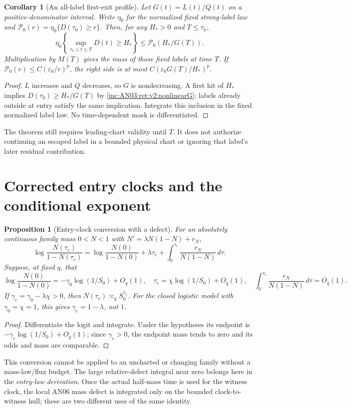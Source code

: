\documentclass[11pt]{article}
\numberwithin{equation}{section}
\newtheorem{proposition}[theorem]{Proposition}
\newtheorem{corollary}[theorem]{Corollary}
\theoremstyle{remark}\newtheorem{remark}[theorem]{Remark}
\newcommand{\dd}{\,d}
\newcommand{\1}{\mathbf 1}
\begin{document}
\begin{corollary}[An all-label first-exit profile]
\label{inc:AN03:ret:v2:exitprofile}
Let $G(t)=L(t)/Q(t)$ on a positive-denominator interval. Write
$\eta_0$ for the normalized fixed strong-label law and
$\mathcal P_0(r)=\eta_0\{D(\tau_0)\ge r\}$.
Then, for any $H_*>0$ and $T\le\tau_h$,
\begin{equation}\label{inc:AN03:ret:v2:exitmass}
 \eta_0\left\{\sup_{\tau_0\le t\le T}D(t)\ge H_*\right\}
 \le\mathcal P_0(H_*/G(T)).
\end{equation}
Multiplication by $M(T)$ gives the mass of those fixed labels at time
$T$. If $\mathcal P_0(r)\le C(\varepsilon_0/r)^p$, the right side is
at most $C(\varepsilon_0G(T)/H_*)^p$.
\end{corollary}
\begin{proof}
$L$ increases and $Q$ decreases, so $G$ is nondecreasing.
A first hit of $H_*$ implies $D(\tau_0)\ge H_*/G(T)$ by
\eqref{inc:AN03:ret:v2:nonlinearG}; labels already outside at entry
satisfy the same implication. Integrate this inclusion in the fixed
normalized label law. No time-dependent mask is differentiated.
\end{proof}
The theorem still requires leading-chart validity until $T$. It does not
authorize continuing an escaped label in a bounded physical chart or
ignoring that label's later residual contribution.

\section{Corrected entry clocks and the conditional exponent}
\label{inc:AN03:ret:v2:clocks}
\begin{proposition}[Entry-clock conversion with a defect]
\label{inc:AN03:ret:v2:clockconversion}
For an absolutely continuous family mass $0<N<1$ with
$N'=\lambda N(1-N)+r_N$,
\begin{equation}\label{inc:AN03:ret:v2:logit}
 \log\frac{N(\tau_e)}{1-N(\tau_e)}
 =\log\frac{N(0)}{1-N(0)}+\lambda\tau_e+
 \int_0^{\tau_e}\frac{r_N}{N(1-N)}\dd\tau.
\end{equation}
Suppose, at fixed $q$, that
\[
 \log\frac{N(0)}{1-N(0)}=-\gamma_0\log(1/S_0)+O_q(1),\quad
 \tau_e=\chi\log(1/S_0)+O_q(1),\quad
 \int_0^{\tau_e}\frac{r_N}{N(1-N)}\dd\tau=O_q(1).
\]
If $\gamma_e=\gamma_0-\lambda\chi>0$, then
$N(\tau_e)\asymp_q S_0^{\gamma_e}$.
For the closed logistic model with $\gamma_0=\chi=1$, this gives
$\gamma_e=1-\lambda$, not $1$.
\end{proposition}
\begin{proof}
Differentiate the logit and integrate. Under the hypotheses its endpoint
is $-\gamma_e\log(1/S_0)+O_q(1)$; since $\gamma_e>0$, the endpoint
mass tends to zero and its odds and mass are comparable.
\end{proof}
This conversion cannot be applied to an uncharted or changing family
without a mass-law/flux budget. The large relative-defect integral near
zero belongs here in the \emph{entry-law derivation}. Once the actual
half-mass time is used for the witness clock, the local AN06 mass defect
is integrated only on the bounded clock-to-witness hull; these are two
different uses of the same identity.
\end{document}
